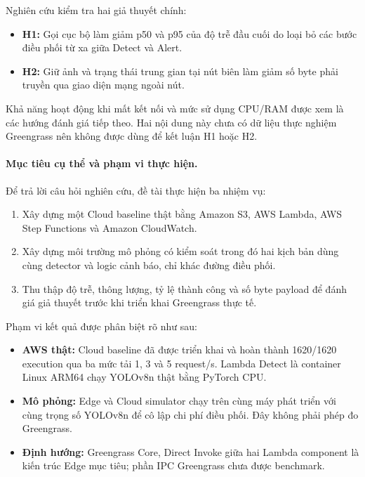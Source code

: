 Nghiên cứu kiểm tra hai giả thuyết chính:

\begin{itemize}
    \item \textbf{H1:} Gọi cục bộ làm giảm p50 và p95 của độ trễ đầu cuối do loại
    bỏ các bước điều phối từ xa giữa Detect và Alert.
    \item \textbf{H2:} Giữ ảnh và trạng thái trung gian tại nút biên làm giảm số
    byte phải truyền qua giao diện mạng ngoài nút.
\end{itemize}

Khả năng hoạt động khi mất kết nối và mức sử dụng CPU/RAM được xem là các hướng
đánh giá tiếp theo. Hai nội dung này chưa có dữ liệu thực nghiệm Greengrass nên
không được dùng để kết luận H1 hoặc H2.

\paragraph{Mục tiêu cụ thể và phạm vi thực hiện.}
Để trả lời câu hỏi nghiên cứu, đề tài thực hiện ba nhiệm vụ:

\begin{enumerate}
    \item Xây dựng một Cloud baseline thật bằng Amazon S3, AWS Lambda, AWS Step
    Functions và Amazon CloudWatch.
    \item Xây dựng môi trường mô phỏng có kiểm soát trong đó hai kịch bản dùng cùng
    detector và logic cảnh báo, chỉ khác đường điều phối.
    \item Thu thập độ trễ, thông lượng, tỷ lệ thành công và số byte payload để đánh
    giá giả thuyết trước khi triển khai Greengrass thực tế.
\end{enumerate}

Phạm vi kết quả được phân biệt rõ như sau:

\begin{itemize}
    \item \textbf{AWS thật:} Cloud baseline đã được triển khai và hoàn thành
    1620/1620 execution qua ba mức tải 1, 3 và 5 request/s. Lambda Detect là
    container Linux ARM64 chạy YOLOv8n thật bằng PyTorch CPU.
    \item \textbf{Mô phỏng:} Edge và Cloud simulator chạy trên cùng máy phát triển
    với cùng trọng số YOLOv8n để cô lập chi phí điều phối. Đây không phải phép đo
    Greengrass.
    \item \textbf{Định hướng:} Greengrass Core, Direct Invoke giữa hai Lambda
    component là kiến trúc Edge mục tiêu; phần IPC Greengrass chưa được benchmark.
\end{itemize}

